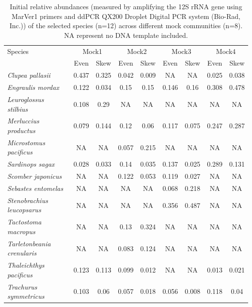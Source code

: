 \documentclass[9pt,twoside,lineno]{pnas-SI}
\begin{document}
\begin{table}\centering
\caption{Initial relative abundances (measured by amplifying the 12S rRNA gene using MarVer1 primers \cite{valsecchi2020} and ddPCR QX200 Droplet Digital PCR system (Bio-Rad, Inc.)) of the selected species (n=12) across different mock communities (n=8). NA represent no DNA template included.}
    \begin{tabular}{lcccccccc}
        \toprule
        {Species} & \multicolumn{2}{c}{Mock1} & \multicolumn{2}{c}{Mock2} & \multicolumn{2}{c}{Mock3} & \multicolumn{2}{c}{Mock4} \\
        & Even & Skew & Even & Skew & Even & Skew & Even & Skew \\
        \midrule
        \textit{Clupea pallasii}           & 0.437 & 0.325  & 0.042  & 0.009     & NA         & NA          & 0.025      & 0.038 \\
        \textit{Engraulis mordax}          & 0.122 & 0.034  & 0.15 & 0.15       & 0.146      & 0.16       & 0.308      & 0.478 \\
        \textit{Leuroglossus stilbius}     & 0.108 & 0.29   & NA & NA         & NA         & NA         & NA         & NA \\    
        \textit{Merluccius productus}      & 0.079 & 0.144  & 0.12 & 0.06       & 0.117      & 0.075      & 0.247      & 0.287 \\
        \textit{Microstomus pacificus}     & NA    & NA     & 0.057  & 0.215     & NA         & NA         & NA         & NA \\    
        \textit{Sardinops sagax}           & 0.028 & 0.033  & 0.14 & 0.035      & 0.137      & 0.025      & 0.289      & 0.131 \\
        \textit{Scomber japonicus}         & NA    & NA     & 0.122  & 0.053      & 0.119      & 0.027     & NA         & NA \\    
        \textit{Sebastes entomelas}        & NA    & NA     & NA & NA          & 0.068      & 0.218     & NA         & NA \\    
        \textit{Stenobrachius leucopsarus} & NA    & NA     & NA & NA          & 0.356      & 0.487     & NA         & NA \\    
        \textit{Tactostoma macropus}       & NA    & NA     & 0.13 & 0.324     & NA         & NA         & NA         & NA \\    
        \textit{Tarletonbeania crenularis} & NA    & NA     & 0.083  & 0.124     & NA         & NA         & NA         & NA \\    
        \textit{Thaleichthys pacificus}    & 0.123 & 0.113  & 0.099  & 0.012     & NA         & NA          & 0.013      & 0.021 \\
        \textit{Trachurus symmetricus}     & 0.103 & 0.06   & 0.057  & 0.018      & 0.056      & 0.008      & 0.118      & 0.04 \\
        \bottomrule
    \end{tabular}
\end{table}


\end{document}
